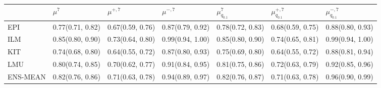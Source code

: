 \begin{tabular}{l p{} p{} p{} p{} p{} p{}}
\toprule
 & $\mu^{7}$ & $\mu^{+, 7}$ & $\mu^{-, 7}$ & $\mu^{7}_{q_{0.1}}$ & $\mu^{+, 7}_{q_{0.1}}$ & $\mu^{-, 7}_{q_{0.1}}$ \\
\midrule
EPI & {0.77\newline(0.71, 0.82)} & {0.67\newline(0.59, 0.76)} & {0.87\newline(0.79, 0.92)} & {0.78\newline(0.72, 0.83)} & {0.68\newline(0.59, 0.75)} & {0.88\newline(0.80, 0.93)} \\
ILM & {0.85\newline(0.80, 0.90)} & {0.73\newline(0.64, 0.80)} & {0.99\newline(0.94, 1.00)} & {0.85\newline(0.80, 0.90)} & {0.74\newline(0.65, 0.81)} & {0.99\newline(0.94, 1.00)} \\
KIT & {0.74\newline(0.68, 0.80)} & {0.64\newline(0.55, 0.72)} & {0.87\newline(0.80, 0.93)} & {0.75\newline(0.69, 0.80)} & {0.64\newline(0.55, 0.72)} & {0.88\newline(0.81, 0.94)} \\
LMU & {0.80\newline(0.74, 0.85)} & {0.70\newline(0.62, 0.77)} & {0.91\newline(0.84, 0.95)} & {0.81\newline(0.75, 0.86)} & {0.72\newline(0.63, 0.79)} & {0.92\newline(0.85, 0.96)} \\
ENS-MEAN & {0.82\newline(0.76, 0.86)} & {0.71\newline(0.63, 0.78)} & {0.94\newline(0.89, 0.97)} & {0.82\newline(0.76, 0.87)} & {0.71\newline(0.63, 0.78)} & {0.96\newline(0.90, 0.99)} \\

\end{tabular}
